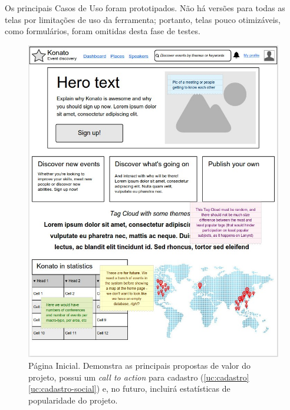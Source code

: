 \documentclass[12pt,a4paper,twoside,hyphens,english,brazil]{abntex2}
\begin{document}
{Os principais Casos de Uso foram prototipados. Não há versões para todas as telas por limitações de uso da ferramenta; portanto, telas pouco otimizáveis, como formulários, foram omitidas desta fase de testes.

\begin{figure}[hb]
\centering
	\includegraphics[width=0.85\linewidth]{imagens/prototipos/1-0_Home.jpg}
	\caption[Página Inicial]{Página Inicial. Demonstra as principais propostas de valor do projeto, possui um \emph{call to action}\footnotemark{} para cadastro (\ref{uc:cadastro} \ref{uc:cadastro-social}) e, no futuro, incluirá estatísticas de popularidade do projeto.}
	\label{prot:home}
\end{figure}

}
\end{document}
